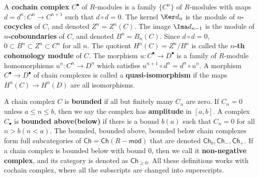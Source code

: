 \begin{defn} A \textbf{cochain complex} $C^\bullet$ of $R$-modules is a family $\{C^n\}$ of $R$-modules with maps $d=d^n:C^n\rightarrow C^{n+1}$ such that $d\circ d=0$. The kernel $\Ker d_n$ is the module of \textbf{$n$-cocycles} of $C$, and denoted $Z^n=Z^n(C)$. The image $\Ima d_{n-1}$ is the module of \textbf{$n$-coboundaries} of $C$, and denoted $B^n=B_{n}(C)$. Since $d\circ d=0$, $0\subset B^n\subset Z^n\subset C^n$ for all $n$. The quotient $H^n(C)=Z^n/B^n$ is called the \textbf{$n$-th cohomology module} of $C$. The morphism $u:C^\bullet\rightarrow D^\bullet$ is a family of $R$-module homomorphisms $u^n:C^n\rightarrow D^n$ which satisfies $u^{n+1}\circ d^n=d^n\circ u^n$. A morphism $C^\bullet\rightarrow D^\bullet$ of chain complexes is called a \textbf{quasi-isomorphism} if the maps $H^n(C)\rightarrow H^n(D)$ are all isomorphisms.
\end{defn}

\begin{defn} A chain complex $C$ is \textbf{bounded} if all but finitely many $C_n$ are zero. If $C_n=0$ unless $a\leq n\leq b$, then we say the complex has \textbf{amplitude} in $[a,b]$. A complex $C_\bullet$ is \textbf{bounded above(below)} if there is a bound $b(a)$ such that $C_n=0$ for all $n>b(n<a)$. The bounded, bounded above, bounded below chain complexes form full subcategories of $\mathsf{Ch}=\mathsf{Ch}(R-\mathsf{mod})$ that are denoted $\mathsf{Ch}_b,\mathsf{Ch}_-,\mathsf{Ch}_+$. If a chain complex is bounded below with bound $0$, then we call it \textbf{non-negative complex}, and its category is denoted as $\mathsf{Ch}_{\geq 0}$. All these definitions works with cochain complex, where all the subscripts are changed into superscripts.
\end{defn}

